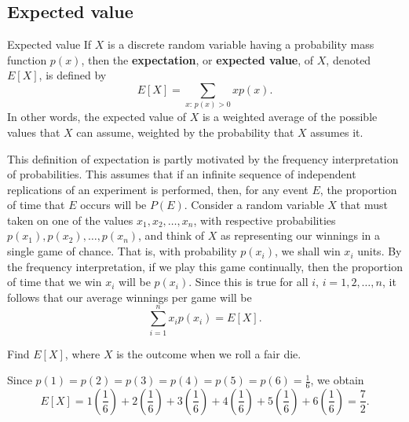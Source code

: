 \subsection{Expected value}
\begin{bdef}{Expected value}\label{expectedvalue}
    If $X$ is a discrete random variable having a probability mass function $p(x)$, then the \textbf{expectation}, or \textbf{expected value}, of $X$, denoted $E\left[ X \right]$, is defined by \[
        E\left[ X \right] = \sum_{x:\, p(x) > 0} xp(x).    
    \] In other words, the expected value of $X$ is a weighted average of the possible values that $X$ can assume, weighted by the probability that $X$ assumes it.
\end{bdef}
This definition of expectation is partly motivated by the frequency interpretation of probabilities. This assumes that if an infinite sequence of independent replications of an experiment is performed, then, for any event $E$, the proportion of time that $E$ occurs will be $P(E)$. Consider a random variable $X$ that must taken on one of the values $x_1, x_2, \dots, x_n$, with respective probabilities $p(x_1), p(x_2), \dots, p(x_n)$, and think of $X$ as representing our winnings in a single game of chance. That is, with probability $p(x_i)$, we shall win $x_i$ units. By the frequency interpretation, if we play this game continually, then the proportion of time that we win $x_i$ will be $p(x_i)$. Since this is true for all $i$, $i = 1, 2, \dots, n$, it follows that our average winnings per game will be \[
    \sum^n_{i = 1} x_ip(x_i) = E\left[ X \right].
\]
\begin{changebar}
    \begin{example}\label{dieexpected}
        Find $E\left[ X \right]$, where $X$ is the outcome when we roll a fair die.
    \end{example}
    \begin{solution}
        Since $p(1) = p(2) = p(3) = p(4) = p(5) = p(6) = \frac{1}{6}$, we obtain \[
            E\left[ X \right] = 1\left( \frac{1}{6} \right) + 2\left( \frac{1}{6} \right) + 3\left( \frac{1}{6} \right) + 4\left( \frac{1}{6} \right) + 5\left( \frac{1}{6} \right) + 6\left( \frac{1}{6} \right) = \frac{7}{2}.    
        \]
    \end{solution}
\end{changebar}

